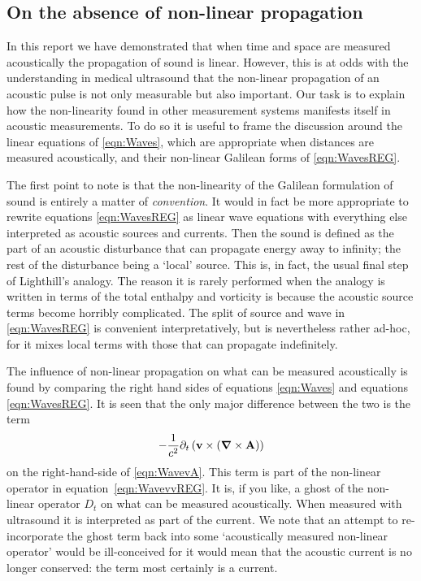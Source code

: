 \documentclass[10pt, fleqn,final,showtrims,oldfontcommands, article,a4paper,oneside]{memoir} %
\newcommand{\eqa}[1]{\begin{align}#1\end{align}}
\newcommand{\eqnref}[1]{\ref{eqn:#1}}
\newcommand{\lr}[1]{\left( #1 \right)}
\renewcommand{\d}{\partial}
\newcommand{\del}{\nabla}
\newcommand{\vdel}{ \mbox{\boldmath $\del$}}
\newcommand{\dt}{{\d_t}}
\newcommand{\Dt}{D_t}
\newcommand{\vA}{\textbf{A}}
\newcommand{\vv}{\textbf{v}}
\begin{document}
\subsection{On the absence of non-linear propagation} \label{sec:NonlinearProp}

In this report we have demonstrated that when time and space are measured acoustically
the propagation of sound is linear.
However, this is at odds with the  understanding in medical ultrasound that the non-linear propagation of an acoustic pulse
is not only measurable but also important.
Our task is to explain how the non-linearity found in other measurement systems  manifests itself in acoustic measurements.
To do so it is useful to frame the discussion around the linear equations of
\eqnref{Waves},
 which are appropriate when distances are measured acoustically,
and their non-linear Galilean forms of \eqnref{WavesREG}.

The first point to note is that the non-linearity of the Galilean formulation of sound is entirely a matter of {\em  convention}.
It would in fact be more appropriate to rewrite equations \eqnref{WavesREG} as linear wave equations with everything else interpreted as acoustic sources and currents.
Then the sound is defined as the part of an acoustic disturbance that can propagate energy away to infinity;
the rest of the disturbance being a `local' source.
This is, in fact, the usual final step of Lighthill's analogy.
The reason it is rarely performed when the analogy is written in terms of the total enthalpy and vorticity is because
the acoustic source terms become horribly complicated.
The split of source and wave in \eqnref{WavesREG} is convenient  interpretatively, but is nevertheless rather ad-hoc,
for it mixes local terms with those that can propagate indefinitely.

The influence of non-linear propagation on what can be measured acoustically is found by comparing the right hand sides of equations \eqnref{Waves} and equations \eqnref{WavesREG}.
It is seen that the only major difference between the two is the term 
\eqa{
- \frac{1}{c^2}\dt \lr{ \vv \times \lr{\vdel \times \vA}} \nonumber
}
 on the right-hand-side of \eqnref{WavevA}.
This term is part of the non-linear operator in equation~\ref{eqn:WavevvREG}.
It is, if you like, a ghost of the non-linear operator $\Dt$ on what can be measured acoustically.
When measured with ultrasound it is interpreted  as part of the current.
We note that an attempt to re-incorporate the ghost  term back into some `acoustically measured non-linear operator' would be ill-conceived 
for it would mean that the acoustic current is no longer conserved:
the term %
most certainly is a current.
\end{document}
